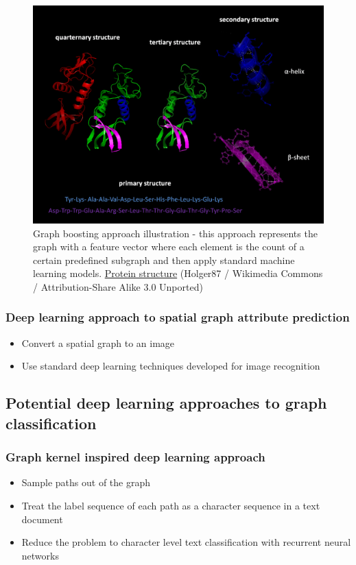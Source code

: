 \documentclass{article}
\begin{document}
\begin{figure}[H]\centering
	\includegraphics[width=\textwidth]{Proteins}
	\caption{
		Graph boosting approach illustration - this approach represents the graph with a feature vector where each element is the count of a certain predefined subgraph and then apply standard machine learning models.
		\href{https://commons.wikimedia.org/wiki/File:Protein_structure.png}
		{Protein structure}
		(Holger87 / Wikimedia Commons / Attribution-Share Alike 3.0 Unported)
	}
	\label{fig:proteins}
\end{figure}

\subsubsection{Deep learning approach to spatial graph attribute prediction}
\begin{itemize}
	\item Convert a	spatial graph to an image
	\item Use standard deep learning techniques developed for image recognition
\end{itemize}

\subsection{Potential deep learning approaches to graph classification}

\subsubsection{Graph kernel inspired deep learning approach}
\begin{itemize}
	\item Sample paths out of the graph
	\item Treat the label sequence of each path as a character sequence in a text document
	\item Reduce the problem to character level text classification with recurrent neural networks
\end{itemize}
\end{document}
